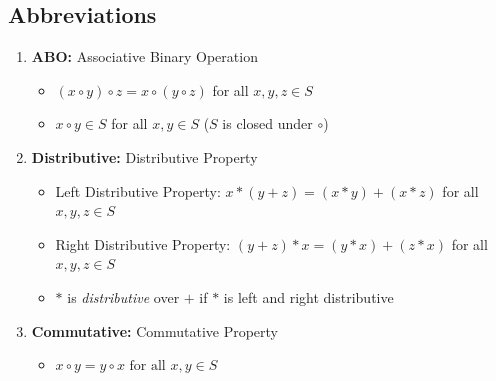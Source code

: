 \documentclass{article}
\theoremstyle{definition}
\begin{document}
\vspace{-10.0mm}
\noindent
\subsection*{Abbreviations}

\medskip
\begin{enumerate}
\item \textbf{ABO:} Associative Binary Operation 
\begin{itemize}
\item $(x \circ y) \circ z = x \circ  (y \circ z)$  
      for all $x, y, z \in S$
\item $x \circ y \in S$ for all $x, y \in S$
      ($S$ is closed under $\circ$)
\end{itemize}

\item \textbf{Distributive:} Distributive Property 
\begin{itemize}
\item Left Distributive Property:  $x * (y+z )= (x*y) + (x*z)$ for
                                   all $x, y, z \in S$
\item Right Distributive Property: $(y + z) * x = (y*x) + (z*x)$
                                   for all $x, y, z \in S$
\item $*$ is \emph{distributive}   over $+$ if $*$ is left and 
                                   right distributive
\end{itemize}

\item \textbf{Commutative:} Commutative Property
\begin{itemize}
\item $x \circ y = y \circ x {\mbox{ for all }}x,y\in S$
\end{itemize}
\end{enumerate}


\noindent
\end{document}
